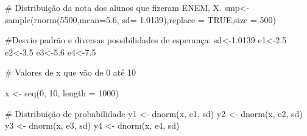 \documentclass[
  letterpaper,
  DIV=11,
  numbers=noendperiod]{scrartcl}
\newenvironment{Shaded}{\begin{snugshade}}{\end{snugshade}}
\newcommand{\AttributeTok}[1]{\textcolor[rgb]{0.40,0.45,0.13}{#1}}
\newcommand{\CommentTok}[1]{\textcolor[rgb]{0.37,0.37,0.37}{#1}}
\newcommand{\ConstantTok}[1]{\textcolor[rgb]{0.56,0.35,0.01}{#1}}
\newcommand{\DecValTok}[1]{\textcolor[rgb]{0.68,0.00,0.00}{#1}}
\newcommand{\FloatTok}[1]{\textcolor[rgb]{0.68,0.00,0.00}{#1}}
\newcommand{\FunctionTok}[1]{\textcolor[rgb]{0.28,0.35,0.67}{#1}}
\newcommand{\NormalTok}[1]{\textcolor[rgb]{0.00,0.23,0.31}{#1}}
\newcommand{\OtherTok}[1]{\textcolor[rgb]{0.00,0.23,0.31}{#1}}
\begin{document}
\begin{Shaded}
\begin{Highlighting}[]
\CommentTok{\# Distribuição da nota dos alunos que fizeram ENEM, X. }
\NormalTok{smp}\OtherTok{\textless{}{-}}\FunctionTok{sample}\NormalTok{(}\FunctionTok{rnorm}\NormalTok{(}\DecValTok{5500}\NormalTok{,}\AttributeTok{mean=}\FloatTok{5.6}\NormalTok{, }\AttributeTok{sd=} \FloatTok{1.0139}\NormalTok{),}\AttributeTok{replace =} \ConstantTok{TRUE}\NormalTok{,}\AttributeTok{size =} \DecValTok{500}\NormalTok{)}

\CommentTok{\#Desvio padrão e diversas possibilidades de esperança:}
\NormalTok{sd}\OtherTok{\textless{}{-}}\FloatTok{1.0139}
\NormalTok{e1}\OtherTok{\textless{}{-}}\FloatTok{2.5}
\NormalTok{e2}\OtherTok{\textless{}{-}}\FloatTok{3.5}
\NormalTok{e3}\OtherTok{\textless{}{-}}\FloatTok{5.6}
\NormalTok{e4}\OtherTok{\textless{}{-}}\FloatTok{7.5}

\CommentTok{\# Valores de x que vão de 0 até 10}

\NormalTok{x }\OtherTok{\textless{}{-}} \FunctionTok{seq}\NormalTok{(}\DecValTok{0}\NormalTok{, }\DecValTok{10}\NormalTok{, }\AttributeTok{length =} \DecValTok{1000}\NormalTok{) }

\CommentTok{\# Distribuição de probabilidade}
\NormalTok{y1 }\OtherTok{\textless{}{-}} \FunctionTok{dnorm}\NormalTok{(x, e1, sd)}
\NormalTok{y2 }\OtherTok{\textless{}{-}} \FunctionTok{dnorm}\NormalTok{(x, e2, sd)}
\NormalTok{y3 }\OtherTok{\textless{}{-}} \FunctionTok{dnorm}\NormalTok{(x, e3, sd)}
\NormalTok{y4 }\OtherTok{\textless{}{-}} \FunctionTok{dnorm}\NormalTok{(x, e4, sd)}


\end{Highlighting}
\end{Shaded}
\end{document}
